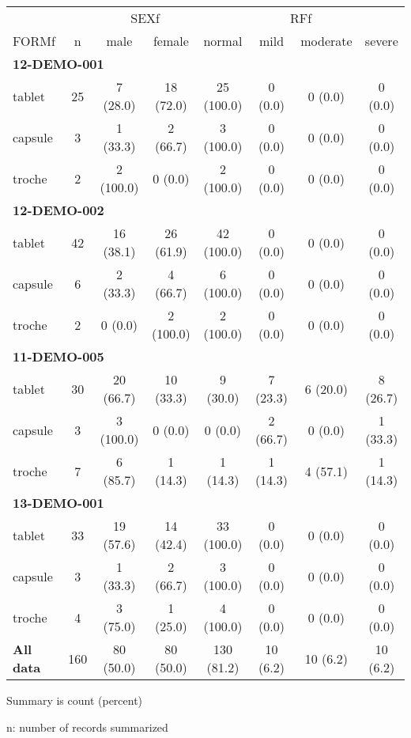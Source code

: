 \setlength{\tabcolsep}{5pt} 
\begin{threeparttable}
\renewcommand{\arraystretch}{1.3}
\begin{tabular}[h]{lccccccc}
\hline
\multicolumn{2}{c}{} & \multicolumn{2}{c}{SEXf} & \multicolumn{4}{c}{RFf} \\
\cmidrule(lr){3-4}
\cmidrule(lr){5-8}
FORMf & n & male & female & normal & mild & moderate & severe \\
\hline
\multicolumn{8}{l}{\textbf{12-DEMO-001}}\\%
tablet & 25 & 7 (28.0) & 18 (72.0) & 25 (100.0) & 0 (0.0) & 0 (0.0) & 0 (0.0) \\
capsule & 3 & 1 (33.3) & 2 (66.7) & 3 (100.0) & 0 (0.0) & 0 (0.0) & 0 (0.0) \\
troche & 2 & 2 (100.0) & 0 (0.0) & 2 (100.0) & 0 (0.0) & 0 (0.0) & 0 (0.0) \\
\hline \multicolumn{8}{l}{\textbf{12-DEMO-002}}\\%
tablet & 42 & 16 (38.1) & 26 (61.9) & 42 (100.0) & 0 (0.0) & 0 (0.0) & 0 (0.0) \\
capsule & 6 & 2 (33.3) & 4 (66.7) & 6 (100.0) & 0 (0.0) & 0 (0.0) & 0 (0.0) \\
troche & 2 & 0 (0.0) & 2 (100.0) & 2 (100.0) & 0 (0.0) & 0 (0.0) & 0 (0.0) \\
\hline \multicolumn{8}{l}{\textbf{11-DEMO-005}}\\%
tablet & 30 & 20 (66.7) & 10 (33.3) & 9 (30.0) & 7 (23.3) & 6 (20.0) & 8 (26.7) \\
capsule & 3 & 3 (100.0) & 0 (0.0) & 0 (0.0) & 2 (66.7) & 0 (0.0) & 1 (33.3) \\
troche & 7 & 6 (85.7) & 1 (14.3) & 1 (14.3) & 1 (14.3) & 4 (57.1) & 1 (14.3) \\
\hline \multicolumn{8}{l}{\textbf{13-DEMO-001}}\\%
tablet & 33 & 19 (57.6) & 14 (42.4) & 33 (100.0) & 0 (0.0) & 0 (0.0) & 0 (0.0) \\
capsule & 3 & 1 (33.3) & 2 (66.7) & 3 (100.0) & 0 (0.0) & 0 (0.0) & 0 (0.0) \\
troche & 4 & 3 (75.0) & 1 (25.0) & 4 (100.0) & 0 (0.0) & 0 (0.0) & 0 (0.0) \\
\hline \hline {\bf All data} & 160 & 80 (50.0) & 80 (50.0) & 130 (81.2) & 10 (6.2) & 10 (6.2) & 10 (6.2) \\
\hline
\end{tabular}
\begin{tablenotes}[flushleft]
\item Summary is count (percent)
\item n: number of records summarized
\end{tablenotes}
\end{threeparttable}
